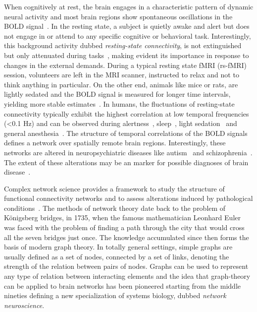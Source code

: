 When cognitively at rest, the brain engages in a characteristic pattern of dynamic neural activity and most brain regions show spontaneous oscillations in the BOLD signal~\cite{biswal1995,raichle2001,gusnard2001}. In the resting state, a subject is quietly awake and alert but does not engage in or attend to any specific cognitive or behavioral task.
Interestingly, this background activity dubbed \emph{resting-state connectivity}, is not extinguished but only attenuated during tasks~\cite{fransson2006}, making evident its importance in response to changes in the external demands.
During a typical resting state fMRI (rs-fMRI) session, volunteers are left in the MRI scanner, instructed to relax and not to think anything in particular.
On the other end, animals like mice or rats, are lightly sedated and the BOLD signal is measured for longer time intervals, yielding more stable estimates~\cite{jonckers2015}.
In humans, the fluctuations of resting-state connectivity typically exhibit the highest correlation at low temporal frequencies (<0.1 Hz) and can be observed during alertness~\cite{fox2006}, sleep~\cite{horovitz2009}, light sedation~\cite{greicius2008} and general anesthesia~\cite{martuzzi2010}.
The structure of temporal correlations of the BOLD signals defines a network over spatially remote brain regions.
Interestingly, these networks are altered in neuropsychiatric diseases like autism~\cite{rudie2013} and schizophrenia~\cite{vandenheuvel2014}.
The extent of these alterations may be an marker for possible diagnoses of brain disease~\cite{stam2014,fornito2015}.

Complex network science provides a framework to study the structure of functional connectivity networks and to assess alterations induced by pathological conditions~\cite{bullmore2009,stam2014,crossley2014,fornito2015}.
The methods of network theory date back to the problem of K{\"o}nigsberg bridges, in 1735, when the famous mathematician Leonhard Euler was faced with the problem of finding a path through the city that would cross all the seven bridges just once.
The knowledge accumulated since then forms the basis of modern graph theory.
In totally general settings, simple graphs are usually defined as a set of nodes,  connected by a set of links, denoting the strength of the relation between pairs of nodes.
Graphs can be used to represent any type of relation between interacting elements and the idea that graph-theory can be applied to brain networks has been pioneered starting from the middle nineties defining a new specialization of systems biology, dubbed \emph{network neuroscience}.

